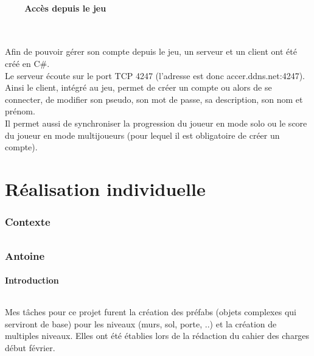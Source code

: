 \documentclass[titlepage, 13px, a4paper]{report}
\begin{document}
\subsection[Accès depuis le jeu]{~~~~Accès depuis le jeu}
\paragraph{} \hspace{0pt} \\
Afin de pouvoir gérer son compte depuis le jeu, un serveur et un client ont été créé en C\#. \\
Le serveur écoute sur le port TCP 4247 (l’adresse est donc accer.ddns.net:4247). Ainsi le client, 
intégré au jeu, permet de créer un compte ou alors de se connecter, de modifier son pseudo, 
son mot de passe, sa description, son nom et prénom. \\
Il permet aussi de synchroniser la progression du joueur en mode solo ou le score du joueur 
en mode multijoueurs (pour lequel il est obligatoire de créer un compte). \\


\newpage


\part{Réalisation individuelle}
\section*{Contexte}
\paragraph{} \hspace{0pt}


\newpage
\section{Antoine}
\subsection{Introduction}
\paragraph{} \hspace{0pt} 
Mes tâches pour ce projet furent la création des préfabs (objets complexes qui
serviront de base) pour les niveaux (murs, sol, porte, ..) et la création de multiples
niveaux. Elles ont été établies lors de la rédaction du cahier des charges début février. \\
\end{document}
